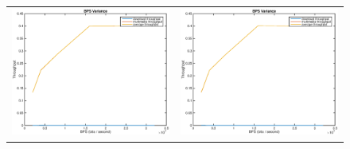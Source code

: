 \begin{figure}
\begin{tabular}{cc}
\includegraphics[scale=0.35]{../../src/fig-simulation_download_multimedia-bps-1_1_25_25_12000.eps} & \includegraphics[scale=0.35]{../../src/fig-simulation_download_multimedia-bps-1_1_25_5_12000.eps} \\ 


\end{tabular}
\end{figure}
